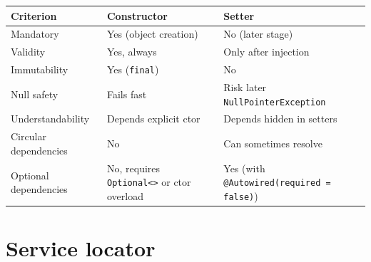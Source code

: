 \begin{table}[h!]
  \renewcommand{\arraystretch}{1.3}
  \centering
  \begin{tabularx}{\textwidth}{lll}
    \hline
    \textbf{Criterion}    & \textbf{Constructor}                              & \textbf{Setter}                                  \\
    \hline
    Mandatory             & Yes (object creation)                             & No (later stage)                                 \\
    Validity              & Yes, always                                       & Only after injection                             \\
    Immutability          & Yes (\texttt{final})                              & No                                               \\
    Null safety           & Fails fast                                        & Risk later \texttt{NullPointerException}         \\
    Understandability     & Depends explicit ctor                             & Depends hidden in setters                        \\
    Circular dependencies & No                                                & Can sometimes resolve                            \\
    Optional dependencies & No, requires \texttt{Optional<>} or ctor overload & Yes (with \texttt{@Autowired(required = false)}) \\
    \hline
  \end{tabularx}
\end{table}


\section{Service locator}



